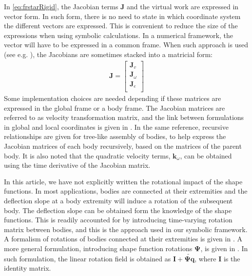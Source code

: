 \documentclass[wes, manuscript]{copernicus}
\renewcommand{\v}[1]{\boldsymbol{#1}}
\newcommand{\m}[1]{\boldsymbol{#1}}
\begin{document}
In \autoref{eq:frstarRigid}, the Jacobian terms $\v{J}$ and the virtual work are expressed in vector form. In such form, there is no need to state in which coordinate system the different vectors are expressed. This is convenient to reduce the size of the expressions when using symbolic calculations. In a numerical framework, the vector will have to be expressed in a common frame. When such approach is used (see e.g. \cite{Lemmer:2018, branlard:2019flex}), the Jacobians are sometimes stacked into a matricial form:
\begin{align}
\m{J} = 
    \begin{bmatrix}
    \v{J}_v \\
    \v{J}_\omega\\
    \v{J}_e \\
    \end{bmatrix}
\end{align}
Some implementation choices are needed depending if these matrices are expressed in the global frame or a body frame. The Jacobian matrices are referred to as velocity transformation matrix, and the link between formulations in global and local coordinates is given in \cite{branlard:2019flex}. In the same reference, recursive relationships are given for tree-like assembly of bodies, to help express the Jacobian matrices of each body recursively, based on the matrices of the parent body. It is also noted that the quadratic velocity terms, $\v{k}_\omega$, can be obtained using the time derivative of the Jacobian matrix.

In this article, we have not explicitly written the rotational impact of the shape functions. In most applications, bodies are connected at their extremities and the deflection slope at a body extremity will induce a rotation of the subsequent body. The deflection slope can be obtained form the knowledge of the shape functions. This is readily accounted for by introducing time-varying rotation matrix between bodies, and this is the approach used in our symbolic framework. A formalism of rotations of bodies connected at their extremities is given in \cite{branlard:2019flex}. A more general formulation, introducing shape function rotations $\m{\Psi}$, is given in \citep{Wallrapp:1994, Schwertassek:book, Lemmer:2018}. In such formulation, the linear rotation field is obtained as $\m{I}+\m{\widetilde{\m{\Psi}\v{q}}}$, where $\m{I}$ is the identity matrix.
\end{document}
